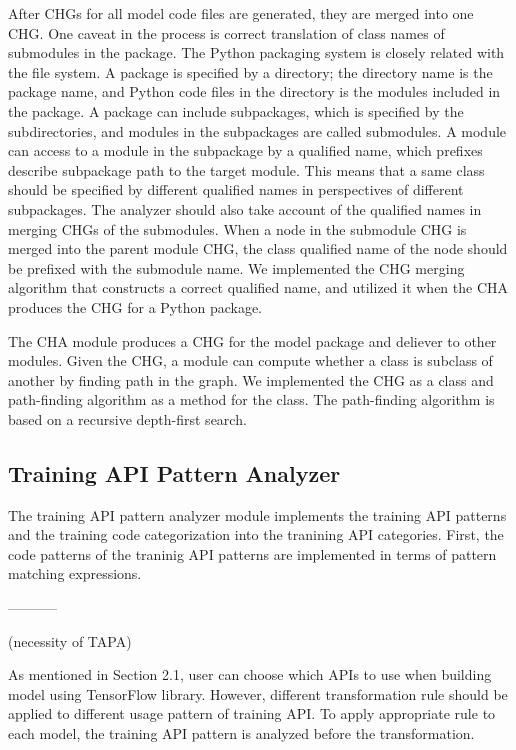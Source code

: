 After CHGs for all model code files are generated, 
they are merged into one CHG.
One caveat in the process is correct translation of class names
of submodules in the package.
The Python packaging system is closely related with the file system.
A package is specified by a directory; 
the directory name is the package name, 
and Python code files in the directory is the modules included in the package.
A package can include subpackages, which is specified
by the subdirectories, and modules in the subpackages are called submodules.
A module can access to a module in the subpackage by a qualified name,
which prefixes describe subpackage path to the target module.
This means that a same class should be specified by different qualified
names in perspectives of different subpackages.
The analyzer should also take account of the qualified names
in merging CHGs of the submodules. 
When a node in the submodule CHG is merged into the parent module CHG,
the class qualified name of the node should be prefixed with the
submodule name.
We implemented the CHG merging algorithm that constructs a correct
qualified name, and utilized it when the CHA produces the CHG for
a Python package. 

The CHA module produces a CHG for the model package and deliever to
other modules. Given the CHG, a module can compute whether a class is
subclass of another by finding path in the graph.
We implemented the CHG as a class and path-finding algorithm as
a method for the class. The path-finding algorithm is based on
a recursive depth-first search.

\subsection{Training API Pattern Analyzer}

The training API pattern analyzer module implements the training API
patterns and the training code categorization into the tranining API categories.
First, the code patterns of the traninig API patterns are implemented
in terms of pattern matching expressions.



-----------

(necessity of TAPA)

As mentioned in Section 2.1, user can choose which APIs to use
when building model using TensorFlow library.
However, different transformation rule should be applied
to different usage pattern of training API.
To apply appropriate rule to each model,
the training API pattern is analyzed before the transformation.

